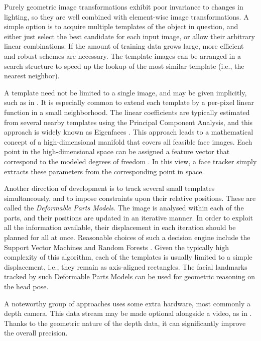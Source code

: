 Purely geometric image transformations exhibit poor invariance to changes in lighting, so they are well combined with element-wise image transformations.
A simple option is to acquire multiple templates of the object in question, and either just select the best candidate for each input image, or allow their arbitrary linear combinations.
If the amount of training data grows large, more efficient and robust schemes are necessary.
The template images can be arranged in a search structure to speed up the lookup of the most similar template (i.e., the nearest neighbor).

A template need not be limited to a single image, and may be given implicitly, such as in \cite{gourier06}.
It is especially common to extend each template by a per-pixel linear function in a small neighborhood.
The linear coefficients are typically estimated from several nearby templates using the Principal Component Analysis, and this approach is widely known as Eigenfaces \cite{srinivasan02,morency03}.
This approach leads to a mathematical concept of a high-dimensional manifold that covers all feasible face images.
Each point in the high-dimensional space can be assigned a feature vector that correspond to the modeled degrees of freedom \cite{balasubramanian07}.
In this view, a face tracker simply extracts these parameters from the corresponding point in space.

Another direction of development is to track several small templates simultaneously, and to impose constraints upon their relative positions.
These are called the \textit{Deformable Parts Models}.
The image is analysed within each of the parts, and their positions are updated in an iterative manner.
In order to exploit all the information available, their displacement in each iteration should be planned for all at once.
Reasonable choices of such a decision engine include the Support Vector Machines \cite{uricar12} and Random Forests \cite{ren14}.
Given the typically high complexity of this algorithm, each of the templates is usually limited to a simple displacement, i.e., they remain as axis-aligned rectangles.
The facial landmarks tracked by such Deformable Parts Models can be used for geometric reasoning on the head pose.

A noteworthy group of approaches uses some extra hardware, most commonly a depth camera.
This data stream may be made optional alongside a video, as in \cite{morency03}.
Thanks to the geometric nature of the depth data, it can significantly improve the overall precision.

